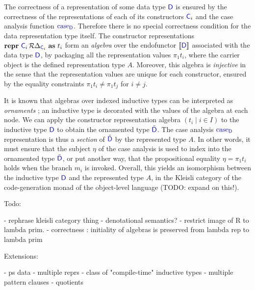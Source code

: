 The correctness of a representation of some data type ${\color{blue}{\mathsf{D}}}$ is ensured by
the correctness of the representations of each of its constructors ${\color{blue}{\mathsf{C}}}_i$
and the case analysis function ${\color{blue}{\mathsf{\textrm{case}_{D}}}}$. Therefore there is no special
correctness condition for the data representation type itself. The constructor
representations $\textbf{repr} \ {{\color{blue}{\mathsf{C}}}_i}\, {\mathcal{R} {\Delta_{{\color{blue}{\mathsf{C}}}_i}}}\ \textbf{as}\ {t_i}$ form an
\emph{algebra} over the endofunctor $\llbracket {\ensuremath{\color{blue}{\mathsf{D}}}} \rrbracket$ associated
with the data type ${\color{blue}{\mathsf{D}}}$, by packaging all the representation values $\pi_1
  t_i$, where the carrier object is the defined representation type $A$.
Moreover, this algebra is \emph{injective} in the sense that the representation
values are unique for each constructor, ensured by the equality constraints
$\pi_1 t_i \neq \pi_1 t_j$ for $i \neq j$.

It is known that algebras over indexed inductive types can be interpreted as
\emph{ornaments} \cite{Dagand2017-nj}; an inductive type is decorated with the
values of the algebra at each node. We can apply the constructor representation
algebra $(t_i \mid i \in I)$ to the inductive type ${\color{blue}{\mathsf{D}}}$ to obtain the
ornamented type $\tilde{{\color{blue}{\mathsf{D}}}}$. The case analysis ${\color{blue}{\mathsf{\textrm{case}_{D}}}}$
representation is thus a \emph{section} of $\tilde{{\color{blue}{\mathsf{D}}}}$ by the represented
type $A$. In other words, it must ensure that the subject $\eta$ of the case
analysis is used to index into the ornamented type $\tilde{{\color{blue}{\mathsf{D}}}}$, or put
another way, that the propositional equality $\eta = \pi_1 t_i$ holds when the
branch $m_i$ is invoked. Overall, this yields an isomorphism between the
inductive type ${\color{blue}{\mathsf{D}}}$ and the represented type $A$, in the Kleisli category
of the code-generation monad of the object-level language (TODO: expand on
this!).

Todo:

- rephrase kleisli category thing
- denotational semantics?
- restrict image of R to lambda prim.
- correctness : initiality of algebras is preserved from lambda rep to lambda prim

Extensions:

- ps data
- multiple reprs
- class of "compile-time" inductive types
- multiple pattern clauses
- quotients
